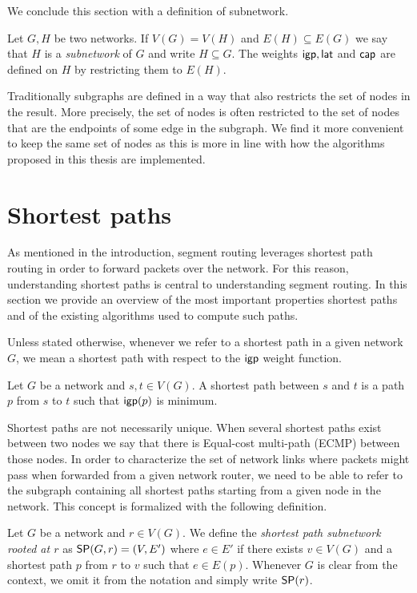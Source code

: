 We conclude this section with a definition of subnetwork.

\begin{definition}
Let $G, H$ be two networks. If $V(G) = V(H)$ and $E(H) \subseteq E(G)$ we say that
$H$ is a \emph{subnetwork} of $G$ and write $H \subseteq G$. The weights $\igp, \lat$
and $\bnd$ are defined on $H$ by restricting them to $E(H)$. 
\end{definition}

Traditionally subgraphs are defined in a way that also restricts the set of nodes in the result.
More precisely, the set of nodes is often restricted to the set of nodes that are the endpoints
of some edge in the subgraph. We find it more convenient to keep the same set of nodes as 
this is more in line with how the algorithms proposed in this thesis are implemented.

\section{Shortest paths}

As mentioned in the introduction, segment routing leverages shortest path routing in order to
forward packets over the network. For this reason, understanding shortest paths is central to 
understanding segment routing. In this section we provide an overview of the most important
properties shortest paths and of the existing algorithms used to compute such paths.

Unless stated otherwise, whenever we refer to a shortest path in a given network $G$, we mean
a shortest path with respect to the $\igp$ weight function.

\begin{definition}
Let $G$ be a network and $s, t \in V(G)$. 
A shortest path between $s$ and $t$ is a path $p$ from $s$ to $t$ such that
$\igp(p)$ is minimum.
\end{definition}

Shortest paths are not necessarily unique. When several shortest paths exist between two nodes we say
that there is Equal-cost multi-path (ECMP) between those nodes. In order to characterize the set of network
links where packets might pass when forwarded from a given network router, we  need to be able to
refer to the subgraph containing all shortest paths starting from a given node in the network. This 
concept is formalized with the following definition.

\begin{definition}
Let $G$ be a network and $r \in V(G)$. We define the \emph{shortest path subnetwork rooted at $r$} as
$\sp(G, r) = (V, E')$ where $e \in E'$ if there exists $v \in V(G)$ and a shortest path $p$ from
$r$ to $v$ such that $e \in E(p)$. Whenever $G$ is clear from the context, we  omit it from 
the notation and simply write $\sp(r)$.
\end{definition}

